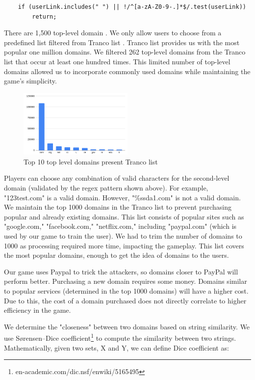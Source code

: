 \begin{lstlisting}
    if (userLink.includes(" ") || !/^[a-zA-Z0-9-.]*$/.test(userLink))
        return;
\end{lstlisting}

There are 1,500 top-level domain \cite{tld}. We only allow users to choose from a predefined list filtered from Tranco list \cite{trancos}. Tranco list provides us with the most popular one million domains. We filtered 262 top-level domains from the Tranco list that occur at least one hundred times. This limited number of top-level domains allowed us to incorporate commonly used domains while maintaining the game's simplicity.

\begin{figure}[h]
    \centering
    \includegraphics[width=0.5\textwidth]{figures/section2/tld.png}
    \caption{Top 10 top level domains present Tranco list}
    \label{fig:marketplace_tld}
\end{figure}

Players can choose any combination of valid characters for the second-level domain (validated by the regex pattern shown above). For example, "123test.com" is a valid domain. However, "\%ssda1.com" is not a valid domain. We maintain the top 1000 domains in the Tranco list to prevent purchasing popular and already existing domains. This list consists of popular sites such as "google.com," "facebook.com," "netflix.com," including "paypal.com" (which is used by our game to train the user). We had to trim the number of domains to 1000 as processing required more time, impacting the gameplay. This list covers the most popular domains, enough to get the idea of domains to the users.

Our game uses Paypal to trick the attackers, so domains closer to PayPal will perform better. Purchasing a new domain requires some money. Domains similar to popular services (determined in the top 1000 domains) will have a higher cost. Due to this, the cost of a domain purchased does not directly correlate to higher efficiency in the game.

We determine the "closeness" between two domains based on string similarity. We use Sørensen–Dice coefficient\footnote{en-academic.com/dic.nsf/enwiki/5165495} to compute the similarity between two strings. Mathematically, given two sets, X and Y, we can define Dice coefficient as:


